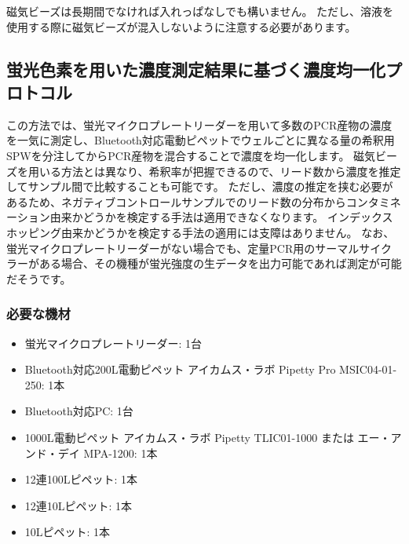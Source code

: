 \documentclass[titlepage,10pt,a4paper,uplatex]{jsbook}
\begin{document}
磁気ビーズは長期間でなければ入れっぱなしでも構いません。
ただし、溶液を使用する際に磁気ビーズが混入しないように注意する必要があります。

\subsection{蛍光色素を用いた濃度測定結果に基づく濃度均一化プロトコル}

この方法では、蛍光マイクロプレートリーダーを用いて多数のPCR産物の濃度を一気に測定し、Bluetooth対応電動ピペットでウェルごとに異なる量の希釈用SPWを分注してからPCR産物を混合することで濃度を均一化します。
磁気ビーズを用いる方法とは異なり、希釈率が把握できるので、リード数から濃度を推定してサンプル間で比較することも可能です。
ただし、濃度の推定を挟む必要があるため、ネガティブコントロールサンプルでのリード数の分布からコンタミネーション由来かどうかを検定する手法は適用できなくなります。
インデックスホッピング由来かどうかを検定する手法の適用には支障はありません。
なお、蛍光マイクロプレートリーダーがない場合でも、定量PCR用のサーマルサイクラーがある場合、その機種が蛍光強度の生データを出力可能であれば測定が可能だそうです。

\subsubsection{必要な機材}
\begin{itemize}
\item 蛍光マイクロプレートリーダー: 1台
\item Bluetooth対応200{\textmu}L電動ピペット アイカムス・ラボ Pipetty Pro MSIC04-01-250: 1本
\item Bluetooth対応PC: 1台
\item 1000{\textmu}L電動ピペット アイカムス・ラボ Pipetty TLIC01-1000 または エー・アンド・デイ MPA-1200: 1本
\item 12連100{\textmu}Lピペット: 1本
\item 12連10{\textmu}Lピペット: 1本
\item 10{\textmu}Lピペット: 1本
\end{itemize}
\end{document}
